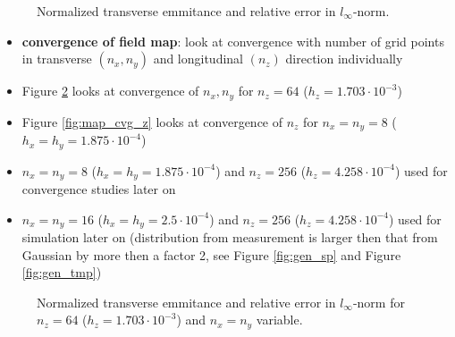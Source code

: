 \begin{center}
\begin{figure}[H]
   \begin{subfigure}{0.4\textwidth}
      
   \end{subfigure}
   \qquad \qquad \qquad
   \begin{subfigure}{0.4\textwidth}
      
   \end{subfigure}
   \caption{Normalized transverse emmitance and relative error in $l_\infty$-norm.}
   \label{fig:int_cvg}
\end{figure}
\end{center}

\newpage

\begin{itemize}
   \item \textbf{convergence of field map}: look at convergence with number of grid points in transverse $(n_x, n_y)$ and longitudinal $(n_z)$ direction individually
   \item Figure \ref{fig:map_cvg_xy} looks at convergence of $n_x, n_y$ for $n_z=64$ ($h_z=1.703 \cdot 10^{-3}$)
   \item Figure \ref{fig:map_cvg_z} looks at convergence of $n_z$ for $n_x=n_y=8$ ($h_x=h_y=1.875 \cdot 10^{-4}$)
   \item $n_x=n_y=8$ ($h_x=h_y=1.875 \cdot 10^{-4}$) and $n_z=256$ ($h_z=4.258 \cdot 10^{-4}$) used for convergence studies later on
   \item $n_x=n_y=16$ ($h_x=h_y=2.5 \cdot 10^{-4}$) and $n_z=256$ ($h_z=4.258 \cdot 10^{-4}$) used for simulation later on (distribution from measurement is larger then that from Gaussian by more then a factor 2, see Figure \ref{fig:gen_sp} and Figure \ref{fig:gen_tmp})
\end{itemize}

\begin{center}
\begin{figure}[H]
   \begin{subfigure}{0.4\textwidth}
      
   \end{subfigure}
   \qquad \qquad \qquad
   \begin{subfigure}{0.4\textwidth}
      
   \end{subfigure}
   \caption{Normalized transverse emmitance and relative error in $l_\infty$-norm for $n_z=64$ ($h_z=1.703 \cdot 10^{-3}$) and $n_x=n_y$ variable.}
   \label{fig:map_cvg_xy}
\end{figure}
\end{center}

